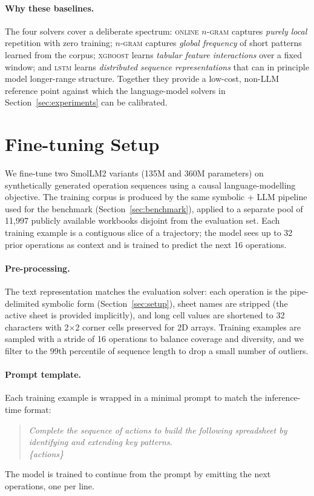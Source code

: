 \documentclass{article}
\theoremstyle{plain}
\theoremstyle{definition}
\theoremstyle{remark}
\begin{document}
\paragraph{Why these baselines.}
The four solvers cover a deliberate spectrum: \textsc{online $n$-gram} captures \emph{purely local} repetition with zero training; \textsc{$n$-gram} captures \emph{global frequency} of short patterns learned from the corpus; \textsc{xgboost} learns \emph{tabular feature interactions} over a fixed window; and \textsc{lstm} learns \emph{distributed sequence representations} that can in principle model longer-range structure.
Together they provide a low-cost, non-LLM reference point against which the language-model solvers in Section~\ref{sec:experiments} can be calibrated.


\section{Fine-tuning Setup}\label{app:slm-training}

We fine-tune two SmolLM2 variants (135M and 360M parameters) on synthetically generated
operation sequences using a causal language-modelling objective.
The training corpus is produced by the same symbolic + LLM pipeline used for the benchmark
(Section~\ref{sec:benchmark}), applied to a separate pool of 11{,}997 publicly available
workbooks disjoint from the evaluation set.
Each training example is a contiguous slice of a trajectory; the model sees up to 32 prior
operations as context and is trained to predict the next 16 operations.

\paragraph{Pre-processing.}
The text representation matches the evaluation solver: each operation is the pipe-delimited
symbolic form (Section~\ref{sec:setup}), sheet names are stripped (the active sheet is
provided implicitly), and long cell values are shortened to 32 characters with 2$\times$2
corner cells preserved for 2D arrays.
Training examples are sampled with a stride of 16 operations to balance coverage and
diversity, and we filter to the 99th percentile of sequence length to drop a small number
of outliers.

\paragraph{Prompt template.}
Each training example is wrapped in a minimal prompt to match the inference-time format:
\begin{quote}\itshape\small
Complete the sequence of actions to build the following spreadsheet by identifying and
extending key patterns.\\[2pt]
\{actions\}
\end{quote}
The model is trained to continue from the prompt by emitting the next operations, one per
line.
\end{document}
